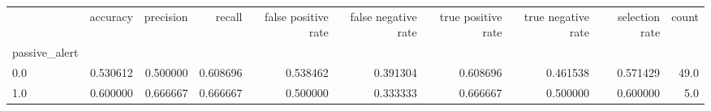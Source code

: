 \begin{tabular}{lrrrrrrrrr}
\toprule
{} &  accuracy &  precision &    recall &  false positive rate &  false negative rate &  true positive rate &  true negative rate &  selection rate &  count \\
passive\_alert &           &            &           &                      &                      &                     &                     &                 &        \\
\midrule
0.0           &  0.530612 &   0.500000 &  0.608696 &             0.538462 &             0.391304 &            0.608696 &            0.461538 &        0.571429 &   49.0 \\
1.0           &  0.600000 &   0.666667 &  0.666667 &             0.500000 &             0.333333 &            0.666667 &            0.500000 &        0.600000 &    5.0 \\
\bottomrule
\end{tabular}
